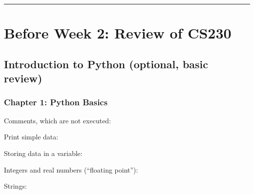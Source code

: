 \documentclass[letterpaper,10pt,english]{sphinxmanual}
\begin{document}
\bigskip\hrule\bigskip



\section{Before Week 2: Review of CS230}
\label{\detokenize{big-cheat-sheet:before-week-2-review-of-cs230}}

\subsection{Introduction to Python (optional, basic review)}
\label{\detokenize{big-cheat-sheet:introduction-to-python-optional-basic-review}}

\subsubsection{Chapter 1: Python Basics}
\label{\detokenize{big-cheat-sheet:chapter-1-python-basics}}
Comments, which are not executed:

\begin{sphinxVerbatim}[commandchars=\\\{\}]
\end{sphinxVerbatim}

Print simple data:

\begin{sphinxVerbatim}[commandchars=\\\{\}]
    
\end{sphinxVerbatim}

Storing data in a variable:

\begin{sphinxVerbatim}[commandchars=\\\{\}]
  
\end{sphinxVerbatim}

Integers and real numbers (“floating point”):

\begin{sphinxVerbatim}[commandchars=\\\{\}]
    
\end{sphinxVerbatim}

Strings:
\end{document}
